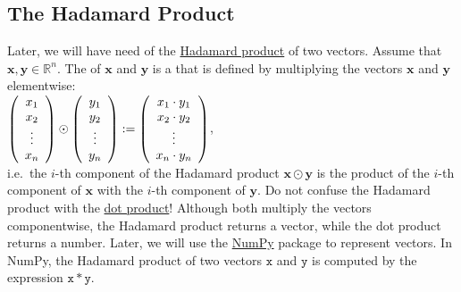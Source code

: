\subsection{The Hadamard Product}
Later, we will have need of the \href{https://en.wikipedia.org/wiki/Hadamard_product_(matrices)}{Hadamard product} 
 of two vectors.  Assume that $\mathbf{x}, \mathbf{y} \in \mathbb{R}^n$.  The  of
$\mathbf{x}$ and $\mathbf{y}$ is a  that is defined by multiplying the vectors $\mathbf{x}$ and $\mathbf{y}$ elementwise:
\\[0.2cm]
\hspace*{1.3cm}
$\left(
  \begin{array}[c]{c}
    x_1 \\
    x_2 \\
    \vdots \\
    x_n
  \end{array}
\right) \odot
\left(
  \begin{array}[c]{c}
    y_1 \\
    y_2 \\
    \vdots \\
    y_n
  \end{array}
\right) := 
\left(
  \begin{array}[c]{c}
    x_1 \cdot y_1 \\
    x_2 \cdot y_2 \\
    \vdots \\
    x_n \cdot y_n
  \end{array}
\right)
$,
\\[0.2cm]
i.e.~the $i$-th component of the Hadamard product $\mathbf{x} \odot \mathbf{y}$ is the product of the $i$-th
component of $\mathbf{x}$ with the $i$-th component of $\mathbf{y}$.  Do not confuse the Hadamard product with
the \href{https://en.wikipedia.org/wiki/Dot_product}{dot product}!  Although both multiply the vectors
componentwise, the Hadamard product returns a vector, while the dot product returns a number.  Later, we will
use the \href{http://www.numpy.org}{NumPy} package to represent vectors.  In NumPy, the Hadamard product of two
vectors $\mathtt{x}$ and $\mathtt{y}$ is computed by the expression $\mathtt{x} * \mathtt{y}$.

